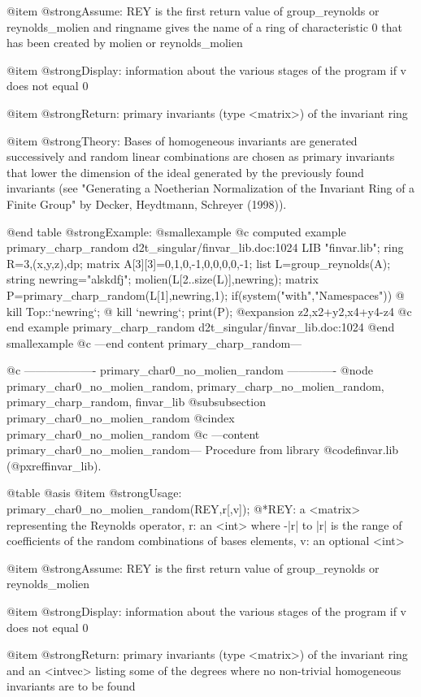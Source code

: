 @item @strong{Assume:}
REY is the first return value of group_reynolds or reynolds_molien and
ringname gives the name of a ring of characteristic 0 that has been
created by molien or reynolds_molien

@item @strong{Display:}
information about the various stages of the program if v does not
equal 0

@item @strong{Return:}
primary invariants (type <matrix>) of the invariant ring

@item @strong{Theory:}
Bases of homogeneous invariants are generated successively and random
linear combinations are chosen as primary invariants that lower the
dimension of the ideal generated by the previously found invariants
(see "Generating a Noetherian Normalization of the Invariant Ring of
a Finite Group" by Decker, Heydtmann, Schreyer (1998)).

@end table
@strong{Example:}
@smallexample
@c computed example primary_charp_random d2t_singular/finvar_lib.doc:1024 
LIB "finvar.lib";
ring R=3,(x,y,z),dp;
matrix A[3][3]=0,1,0,-1,0,0,0,0,-1;
list L=group_reynolds(A);
string newring="alskdfj";
molien(L[2..size(L)],newring);
matrix P=primary_charp_random(L[1],newring,1);
if(system("with","Namespaces")) @{ kill Top::`newring`; @}
kill `newring`;
print(P);
@expansion{} z2,x2+y2,x4+y4-z4
@c end example primary_charp_random d2t_singular/finvar_lib.doc:1024
@end smallexample
@c ---end content primary_charp_random---

@c ------------------- primary_char0_no_molien_random -------------
@node primary_char0_no_molien_random, primary_charp_no_molien_random, primary_charp_random, finvar_lib
@subsubsection primary_char0_no_molien_random
@cindex primary_char0_no_molien_random
@c ---content primary_char0_no_molien_random---
Procedure from library @code{finvar.lib} (@pxref{finvar_lib}).

@table @asis
@item @strong{Usage:}
primary_char0_no_molien_random(REY,r[,v]);
@*REY: a <matrix> representing the Reynolds operator, r: an <int> where
-|r| to |r| is the range of coefficients of the random combinations of
bases elements, v: an optional <int>

@item @strong{Assume:}
REY is the first return value of group_reynolds or reynolds_molien

@item @strong{Display:}
information about the various stages of the program if v does not
equal 0

@item @strong{Return:}
primary invariants (type <matrix>) of the invariant ring and an
<intvec> listing some of the degrees where no non-trivial homogeneous
invariants are to be found

